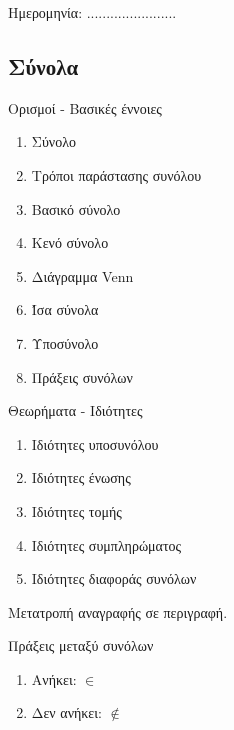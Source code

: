 \documentclass[twoside,nofonts,internet,math,spyros]{frontisthrio}
\newcommand{\myitem}{\stepcounter{enumi}\item[\raisebox{0.5mm}{\faExclamationTriangle}\ \Large$\square$]}
\begin{document}
\begin{flushright}
\faCalendar* Ημερομηνία: .......................
\end{flushright}
\begin{mybox}[mysubtitle]{\section{Σύνολα}}
\begin{tcbraster}[raster columns=2,raster equal height]
\begin{myleftbox}{Ορισμοί - Βασικές έννοιες\ \ \faBook}
\begin{enumerate}[itemsep=0mm]
\item Σύνολο
\item Τρόποι παράστασης συνόλου
\item Βασικό σύνολο
\item Κενό σύνολο
\item Διάγραμμα Venn
\item Ίσα σύνολα
\item Υποσύνολο
\item Πράξεις συνόλων
\end{enumerate}
\end{myleftbox}
\begin{myrightbox}{Θεωρήματα - Ιδιότητες\ \ \faTools}
\begin{enumerate}[itemsep=0mm]
\item Ιδιότητες υποσυνόλου
\item Ιδιότητες ένωσης
\item Ιδιότητες τομής
\item Ιδιότητες συμπληρώματος
\item Ιδιότητες διαφοράς συνόλων
\end{enumerate}
\end{myrightbox}
\end{tcbraster}
\begin{multicols}{2}
\begin{todolist}[itemsep=0mm]
\item Μετατροπή αναγραφής σε περιγραφή.
\myitem Πράξεις μεταξύ συνόλων
\end{todolist}
\end{multicols}
\begin{multicols}{2}
\begin{enumerate}[itemsep=0mm]
\item Ανήκει: $ \in $
\item Δεν ανήκει: $ \notin $

\end{enumerate}
\end{multicols}
\end{mybox}
\end{document}
